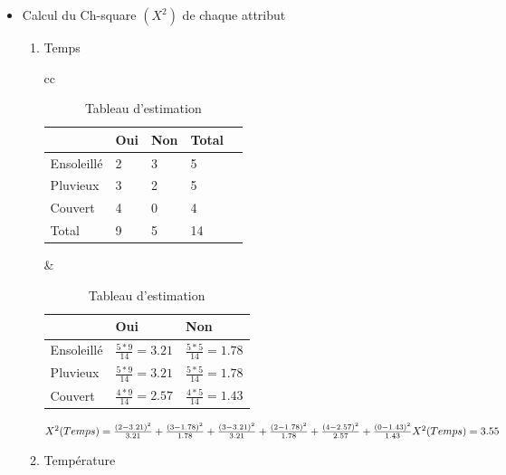 \documentclass[a4paper, 11pt]{report}
\begin{document}
\begin{itemize}
\item Calcul du Ch-square $(X^2)$ de chaque attribut
\begin{enumerate}
\item Temps

\begin{table}[!h]
\begin{small}
\begin{tabular}{cc}

    \begin{minipage}{.5\linewidth}
   
\begin{tabular}{| l | l | l | l | l |}
\hline
 & Oui & Non & Total\\
\hline
Ensoleillé & 2 & 3 & 5\\
\hline
Pluvieux & 3 & 2 & 5 \\
\hline
Couvert & 4 & 0 & 4 \\
\hline
Total & 9 & 5 & 14 \\
\hline
\end{tabular} 
      \caption{Tableau d'observation}

    \end{minipage} &

    \begin{minipage}{.5\linewidth}
\begin{tabular}{| l | l | l |}
\hline
 & Oui & Non\\
\hline
Ensoleillé & $\frac{5*9}{14} = 3.21$ & $\frac{5*5}{14} = 1.78$\\
\hline
Pluvieux & $\frac{5*9}{14} = 3.21$ & $\frac{5*5}{14} = 1.78$ \\
\hline
Couvert & $\frac{4*9}{14} = 2.57$ & $\frac{4*5}{14} = 1.43$  \\
\hline
\end{tabular} 
      \caption{Tableau d'estimation}
 
    \end{minipage} 
\end{tabular}
\end{small}
\end{table}


$X^2(Temps) = \frac{(2-3.21)^2}{3.21}+\frac{(3-1.78)^2}{1.78}+\frac{(3-3.21)^2}{3.21}+\frac{(2-1.78)^2}{1.78}+\frac{(4-2.57)^2}{2.57}+\frac{(0-1.43)^2}{1.43}\\
X^2(Temps) = 3.55$


\item Température


\end{enumerate}
\end{itemize}
\end{document}

